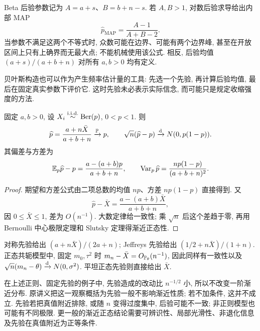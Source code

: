 Beta 后验参数记为 $A=a+s$、$B=b+n-s$. 若 $A,B>1$, 对数后验求导给出内部 MAP
\[
 \widehat p_{\mathrm{MAP}}=\frac{A-1}{A+B-2}.
\]
当参数不满足这两个不等式时, 众数可能在边界、可能有两个边界峰, 甚至在开放区间上只有上确界而无最大点; 不能机械使用该公式. 相反, 后验均值 $(a+s)/(a+b+n)$ 对所有 $a,b>0$ 均有定义. 

贝叶斯构造也可以作为产生频率估计量的工具: 先选一个先验, 再计算后验均值, 最后在固定真实参数下评价它. 这时先验未必表示实际信念, 而可能只是规定收缩强度的方法. 

\begin{proposition}
固定 $a,b>0$, 设 $X_i\stackrel{\mathrm{i.i.d.}}{\sim}\operatorname{Ber}(p)$, $0<p<1$. 则
\[
 \widehat p=\frac{a+n\bar X}{a+b+n}\xrightarrow{\mathbb P} p,\qquad
 \sqrt n(\widehat p-p)\xrightarrow{\mathrm d} N(0,p(1-p)).
\]
其偏差与方差为
\[
 \mathbb E_p\widehat p-p=\frac{a-(a+b)p}{a+b+n},\qquad
 \operatorname{Var}_p\widehat p=\frac{np(1-p)}{(a+b+n)^2}.
\]
\end{proposition}
\begin{proof}
期望和方差公式由二项总数的均值 $np$、方差 $np(1-p)$ 直接得到. 又
\[
 \widehat p-\bar X=\frac{a-(a+b)\bar X}{a+b+n},
\]
因 $0\leq\bar X\leq1$, 差为 $O(n^{-1})$. 大数定律给一致性; 乘 $\sqrt n$ 后这个差趋于零, 再用 Bernoulli 中心极限定理和 Slutsky 定理得渐近正态性. 
\end{proof}
对称先验给出 $(a+n\bar X)/(2a+n)$; Jeffreys 先验给出 $(1/2+n\bar X)/(1+n)$. 正态共轭模型中, 固定 $m_0,\tau^2$ 时 $m_n-\bar X=O_{\mathbb P_\theta}(n^{-1})$, 因此同样有一致性以及 $\sqrt n(m_n-\theta)\xrightarrow{\mathrm d} N(0,\sigma^2)$. 平坦正态先验则直接给出 $\bar X$. 

\begin{remark}[先验影响的适用范围]
在上述正则、固定先验的例子中, 先验造成的改动比 $n^{-1/2}$ 小, 所以不改变一阶渐近分布. 原讲义把这一观察概括为先验一般不影响渐近性质; 若不加条件, 这并不成立. 先验若把真值附近排除, 或随 $n$ 变得过度集中, 后验可能不一致; 非正则模型也可能有不同极限. 更一般的渐近正态结论需要可辨识性、局部光滑性、非退化信息及先验在真值附近为正等条件. 
\end{remark}
